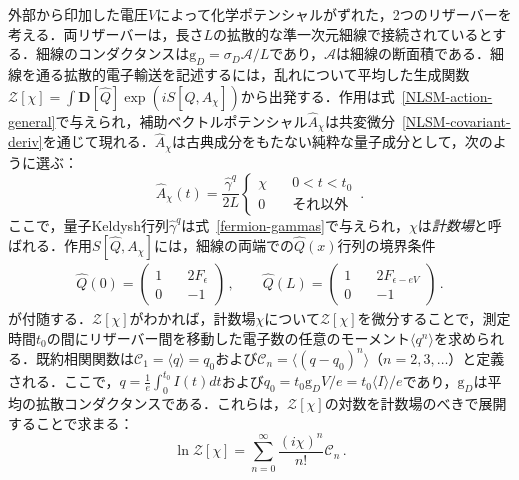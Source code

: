 \documentclass[a4paper,11pt]{ltjsarticle}
\def\D{\mathbf{D}}
\begin{document}
外部から印加した電圧$V$によって化学ポテンシャルがずれた，2つのリザーバーを考える．両リザーバーは，長さ$L$の拡散的な準一次元細線で接続されているとする．細線のコンダクタンスは$\mathrm{g}_{D}=\sigma_{D}\mathcal{A}/L$であり，$\mathcal{A}$は細線の断面積である．細線を通る拡散的電子輸送を記述するには，乱れについて平均した生成関数$\mathcal{Z}[\chi]=\int\D[\hat Q]\exp(iS[\hat Q,A_{\chi}])$から出発する．作用は式~\eqref{NLSM-action-general}で与えられ，補助ベクトルポテンシャル$\hat{A}_{\chi}$は共変微分~\eqref{NLSM-covariant-deriv}を通じて現れる．$\hat{A}_{\chi}$は古典成分をもたない純粋な量子成分として，次のように選ぶ：
\begin{equation}\label{Part-II-FCS-A}
\hat{A}_{\chi}(t)=\frac{\hat{\gamma}^{q}}{2L}\left\{\begin{array}{cc}\chi\quad
& 0<t<t_{0}
\\ 0\quad & \text{それ以外}\end{array}\right.\,.
\end{equation}
ここで，量子Keldysh行列$\hat{\gamma}^{q}$は式~\eqref{fermion-gammas}で与えられ，$\chi$は{\em 計数場}と呼ばれる．作用$S[\hat{Q},A_{\chi}]$には，細線の両端での$\hat Q(x)$行列の境界条件
\begin{eqnarray}\label{Part-II-Q-boundary}
\hat Q(0)=\left(\begin{array}{cc} 1\quad & 2F_{\epsilon}
\\ 0\quad & -1
\end{array}\right)\,, \qquad
\hat Q(L)=
\left(\begin{array}{cc} 1\quad & 2F_{\epsilon-eV}
\\ 0\quad & -1
\end{array}\right)\,.
\end{eqnarray}
が付随する．$\mathcal{Z}[\chi]$がわかれば，計数場$\chi$について$\mathcal{Z}[\chi]$を微分することで，測定時間$t_0$の間にリザーバー間を移動した電子数の任意のモーメント$\langle
q^n\rangle$を求められる．既約相関関数は$\mathcal{C}_{1}=\langle q\rangle=q_0$および$\mathcal{C}_{n}=\langle
(q-q_{0})^n\rangle$（$n=2,3,\ldots$）と定義される．ここで，$q=\frac{1}{e}\int_0^{t_0}I(t)dt$および$q_0=t_{0}\mathrm{g}_{D}V/e=t_{0}\langle I\rangle/e$であり，$\mathrm{g}_D$は平均の拡散コンダクタンスである．これらは，$\mathcal{Z}[\chi]$の対数を計数場のべきで展開することで求まる：
\begin{equation}
\label{Part-II-log-Z-chi}
\ln\mathcal{Z}[\chi]=\sum_{n=0}^{\infty}\frac{(i\chi)^n}{n!}\mathcal{C}_n\,.
\end{equation}
\end{document}
